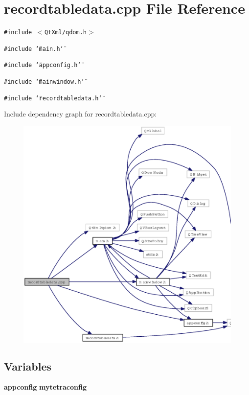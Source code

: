 \section{recordtabledata.cpp File Reference}
\label{recordtabledata_8cpp}
{\tt \#include $<$Qt\-Xml/qdom.h$>$}\par
{\tt \#include \char`\"{}main.h\char`\"{}}\par
{\tt \#include \char`\"{}appconfig.h\char`\"{}}\par
{\tt \#include \char`\"{}mainwindow.h\char`\"{}}\par
{\tt \#include \char`\"{}recordtabledata.h\char`\"{}}\par


Include dependency graph for recordtabledata.cpp:\begin{figure}[H]
\begin{center}
\leavevmode
\includegraphics[width=323pt]{recordtabledata_8cpp__incl}
\end{center}
\end{figure}
\subsection*{Variables}
\begin{CompactItemize}
\item 
{\bf appconfig} {\bf mytetraconfig}
\end{CompactItemize}



